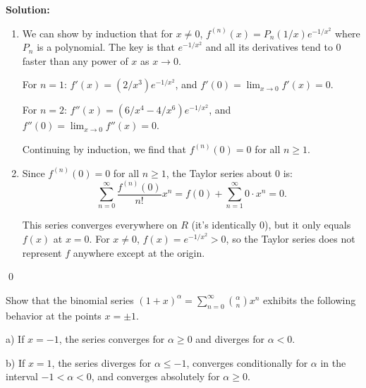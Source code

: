 \noindent\textbf{Solution:}
\begin{enumerate}[label=(\alph*)]
\item We can show by induction that for \( x \neq 0 \), \( f^{(n)}(x) = P_n(1/x)e^{-1/x^2} \) where \( P_n \) is a polynomial. The key is that \( e^{-1/x^2} \) and all its derivatives tend to 0 faster than any power of \( x \) as \( x \to 0 \).

For \( n = 1 \): \( f'(x) = (2/x^3)e^{-1/x^2} \), and \( f'(0) = \lim_{x \to 0} f'(x) = 0 \).

For \( n = 2 \): \( f''(x) = (6/x^4 - 4/x^6)e^{-1/x^2} \), and \( f''(0) = \lim_{x \to 0} f''(x) = 0 \).

Continuing by induction, we find that \( f^{(n)}(0) = 0 \) for all \( n \geq 1 \).

\item Since \( f^{(n)}(0) = 0 \) for all \( n \geq 1 \), the Taylor series about 0 is:
\[\sum_{n=0}^{\infty} \frac{f^{(n)}(0)}{n!}x^n = f(0) + \sum_{n=1}^{\infty} 0 \cdot x^n = 0.\]

This series converges everywhere on \( R \) (it's identically 0), but it only equals \( f(x) \) at \( x = 0 \). For \( x \neq 0 \), \( f(x) = e^{-1/x^2} > 0 \), so the Taylor series does not represent \( f \) anywhere except at the origin.
\end{enumerate}\qed


\begin{problembox}
Show that the binomial series \( (1 + x)^\alpha = \sum_{n=0}^\infty \binom{\alpha}{n} x^n \) exhibits the following behavior at the points \( x = \pm 1 \).

a) If \( x = -1 \), the series converges for \( \alpha \geq 0 \) and diverges for \( \alpha < 0 \).

b) If \( x = 1 \), the series diverges for \( \alpha \leq -1 \), converges conditionally for \( \alpha \) in the interval \(-1 < \alpha < 0 \), and converges absolutely for \( \alpha \geq 0 \).
\end{problembox}

